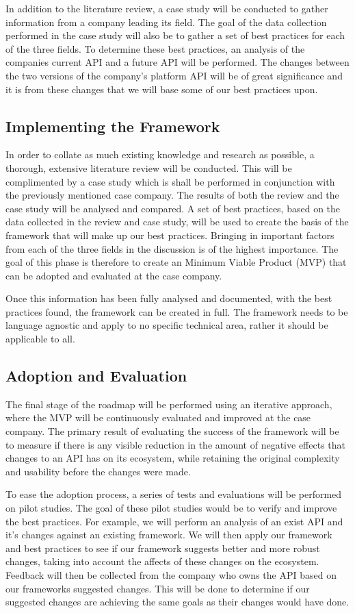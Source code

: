 \documentclass{article}
\begin{document}
In addition to the literature review, a case study will be conducted to gather information from a company leading its field. The goal of the data collection performed in the case study will also be to gather a set of best practices for each of the three fields. To determine these best practices, an analysis of the companies current API and a future API will be performed. The changes between the two versions of the company's platform API will be of great significance and it is from these changes that we will base some of our best practices upon.

\subsection{Implementing the Framework}
In order to collate as much existing knowledge and research as possible, a thorough, extensive literature review will be conducted. This will be complimented by a case study which is shall be performed in conjunction with the previously mentioned case company. The results of both the review and the case study will be analysed and compared. A set of best practices, based on the data collected in the review and case study, will be used to create the basis of the framework that will make up our best practices. Bringing in important factors from each of the three fields in the discussion is of the highest importance. The goal of this phase is therefore to create an Minimum Viable Product (MVP) that can be adopted and evaluated at the case company. 

Once this information has been fully analysed and documented, with the best practices found, the framework can be created in full. The framework needs to be language agnostic and apply to no specific technical area, rather it should be applicable to all.

\subsection{Adoption and Evaluation}
The final stage of the roadmap will be performed using an iterative approach, where the MVP will be continuously evaluated and improved at the case company. The primary result of evaluating the success of the framework will be to measure if there is any visible reduction in the amount of negative effects that changes to an API has on its ecosystem, while retaining the original complexity and usability before the changes were made.

To ease the adoption process, a series of tests and evaluations will be performed on pilot studies. The goal of these pilot studies would be to verify and improve the best practices. For example, we will perform an analysis of an exist API and it's changes against an existing framework. We will then apply our framework and best practices to see if our framework suggests better and more robust changes, taking into account the affects of these changes on the ecosystem. Feedback will then be collected from the company who owns the API based on our frameworks suggested changes. This will be done to determine if our suggested changes are achieving the same goals as their changes would have done.
\end{document}
